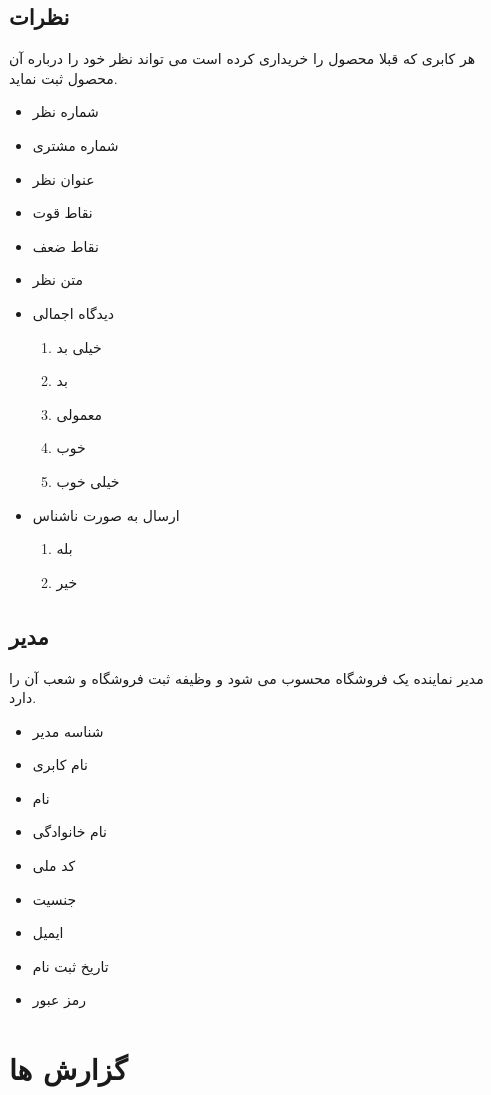 \documentclass[]{article}
\begin{document}
\subsection{نظرات}
هر کابری که قبلا محصول را خریداری کرده است می تواند نظر خود را درباره آن محصول ثبت نماید.
\begin{itemize}
\item شماره نظر
\item شماره مشتری
\item عنوان نظر
\item نقاط قوت  
\item نقاط ضعف
\item متن نظر
\item دیدگاه اجمالی
\begin{enumerate}
\item خیلی بد
\item بد
\item معمولی
\item  خوب
\item  خیلی خوب
\end{enumerate}
\item ارسال به صورت ناشناس
\begin{enumerate}
\item بله
\item خیر
\end{enumerate}
\end{itemize}





\subsection{مدیر}
مدیر نماینده یک فروشگاه محسوب می شود و وظیفه ثبت فروشگاه و شعب آن را دارد.
\begin{itemize}
\item شناسه مدیر
\item نام کابری
\item نام
\item نام خانوادگی
\item کد ملی
\item جنسیت
\item ایمیل
\item تاریخ ثبت نام
\item رمز عبور
\end{itemize}







\section{گزارش ها}
\end{document}

